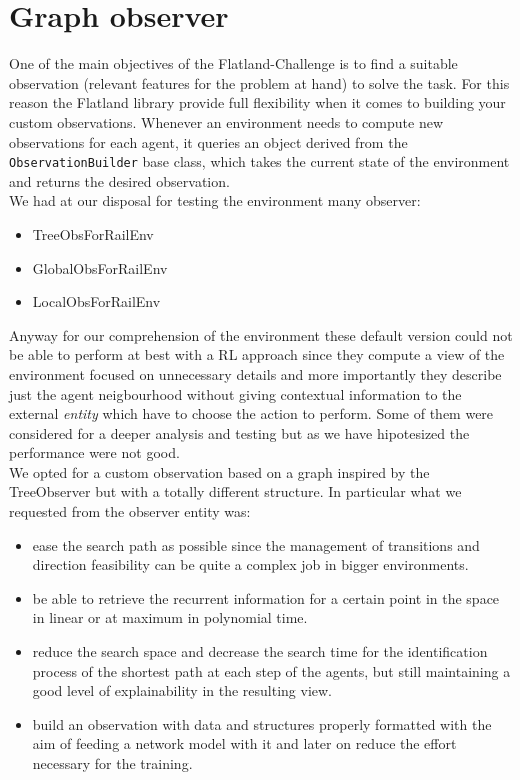 \section{Graph observer}
\label{sec:dagObserv}
One of the main objectives of the Flatland-Challenge is to find a suitable observation (relevant features for the problem at hand) to solve the task. For this reason the Flatland library provide full flexibility when it comes to building your custom observations. Whenever an environment needs to compute new observations for each agent, it queries an object derived from the \texttt{ObservationBuilder} base class, which takes the current state of the environment and returns the desired observation.\\
We had at our disposal for testing the environment many observer:
\begin{itemize}
\item TreeObsForRailEnv
\item GlobalObsForRailEnv
\item LocalObsForRailEnv
\end{itemize}
Anyway for our comprehension of the environment these default version could not be able to perform at best with a RL approach since they compute a view of the environment focused on unnecessary details and more importantly they describe just the agent neigbourhood without giving contextual information to the external \textit{entity} which have to choose the action to perform. Some of them were considered for a deeper analysis and testing but as we have hipotesized the performance were not good.\\
We opted for a custom observation based on a graph inspired by the TreeObserver but with a totally different structure. In particular what we requested from the observer entity was:
\begin{itemize}
    \item ease the search path as possible since the management of transitions and direction feasibility can be quite a complex job in bigger environments.
    \item be able to retrieve the recurrent information for a certain point in the space in linear or at maximum in polynomial time.
    \item reduce the search space and decrease the search time for the identification process of the shortest path at each step of the agents, but still maintaining a good level of explainability in the resulting view.
    \item build an observation with data and structures properly formatted with the aim of feeding a network model with it and later on reduce the effort necessary for the training.
\end{itemize}

